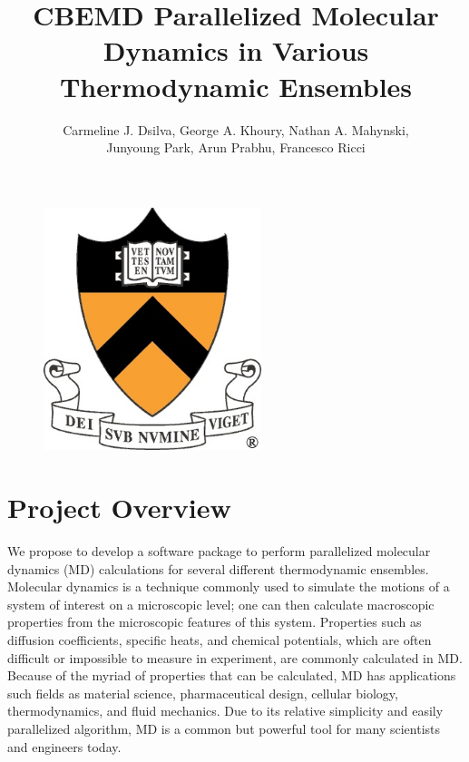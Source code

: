 \documentclass[10pt]{article}
\title{\textbf{CBEMD} Parallelized Molecular Dynamics in Various Thermodynamic Ensembles}
\author{Carmeline J. Dsilva, George A. Khoury, Nathan A. Mahynski,\\ 
Junyoung Park, Arun Prabhu, Francesco Ricci}
\date{}
\begin{document}
\maketitle
\begin{figure}[htbp]
   \centering
   \includegraphics[width=2.5in]{princeton.jpg}
\end{figure}
\thispagestyle{empty}
\newpage
\setcounter{page}{1}
\newpage

\section{Project Overview}
We propose to develop a software package to perform parallelized molecular dynamics (MD) calculations for several different thermodynamic ensembles. Molecular dynamics is a technique commonly used to simulate the motions of a system of interest on a microscopic level; one can then calculate macroscopic properties from the microscopic features of this system. Properties such as diffusion coefficients, specific heats, and chemical potentials, which are often difficult or impossible to measure in experiment, are commonly calculated in MD.  Because of the myriad of properties that can be calculated, MD has applications such fields as material science, pharmaceutical design, cellular biology, thermodynamics, and fluid mechanics.  Due to its relative simplicity and easily parallelized algorithm, MD is a common but powerful tool for many scientists and engineers today.
\end{document}
